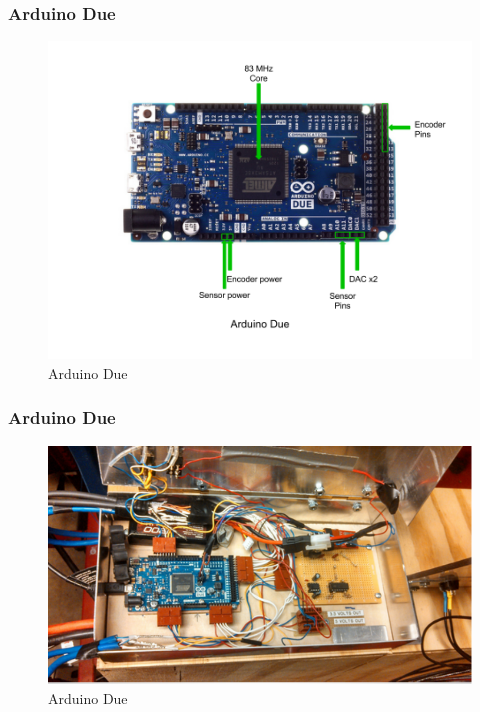\documentclass{beamer}
\begin{document}
\begin{frame}
	\frametitle{Arduino Due}
	\begin{figure}
		\centering 
		\includegraphics[scale=.27]{figures/png/SeniorDesignPresentation-9.png}
		\caption{Arduino Due}
	\end{figure}	
\end{frame}
\begin{frame}
	\frametitle{Arduino Due}
	\begin{figure}
		\centering 
		\includegraphics[scale=.7]{figures/arduino2.pdf}
		\caption{Arduino Due}
	\end{figure}	
\end{frame}
\end{document}
